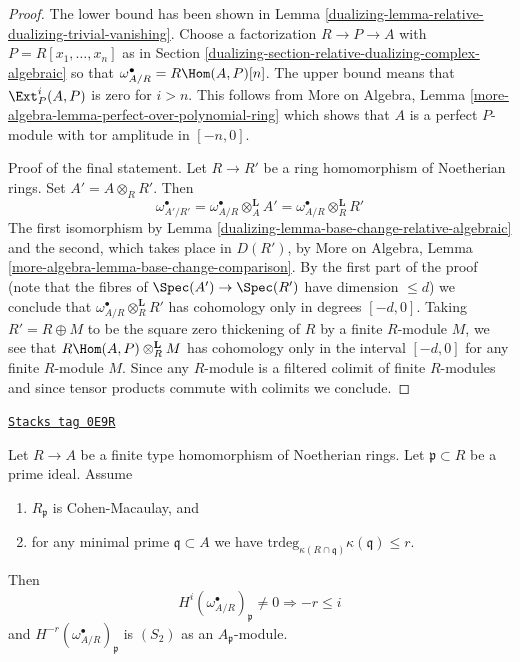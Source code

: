 \begin{proof}

The lower bound has been shown in
Lemma \ref{dualizing-lemma-relative-dualizing-trivial-vanishing}.
Choose a factorization $R \to P \to A$ with $P = R[x_1, \ldots, x_n]$
as in Section \ref{dualizing-section-relative-dualizing-complex-algebraic}
so that $\omega_{A/R}^\bullet = R\Hom(A, P)[n]$.
The upper bound means that $\Ext^i_P(A, P)$ is zero for $i > n$.
This follows from
More on Algebra, Lemma \ref{more-algebra-lemma-perfect-over-polynomial-ring}
which shows that $A$ is a perfect $P$-module with
tor amplitude in $[-n, 0]$.

\medskip\noindent
Proof of the final statement. Let $R \to R'$ be a ring homomorphism
of Noetherian rings. Set $A' = A \otimes_R R'$. Then
$$
\omega_{A'/R'}^\bullet =
\omega_{A/R}^\bullet \otimes_A^\mathbf{L} A' =
\omega_{A/R}^\bullet \otimes_R^\mathbf{L} R'
$$
The first isomorphism by Lemma \ref{dualizing-lemma-base-change-relative-algebraic}
and the second, which takes place in $D(R')$, by
More on Algebra, Lemma \ref{more-algebra-lemma-base-change-comparison}.
By the first part of the proof
(note that the fibres of $\Spec(A') \to \Spec(R')$ have dimension $\leq d$)
we conclude that $\omega_{A/R}^\bullet \otimes_R^\mathbf{L} R'$
has cohomology only in degrees $[-d, 0]$. Taking $R' = R \oplus M$
to be the square zero thickening of $R$ by a finite $R$-module $M$,
we see that $R\Hom(A, P) \otimes_R^\mathbf{L} M$
has cohomology only in the interval $[-d, 0]$ for any finite $R$-module $M$.
Since any $R$-module is a filtered colimit of finite $R$-modules
and since tensor products commute with colimits we conclude.
\end{proof}

\begin{lemma}
\label{dualizing-lemma-relative-dualizing-CM-vanishing}
\href{https://stacks.math.columbia.edu/tag/0E9R}{\texttt{Stacks tag 0E9R}}

Let $R \to A$ be a finite type homomorphism of Noetherian rings.
Let $\mathfrak p \subset R$ be a prime ideal. Assume
\begin{enumerate}
\item $R_\mathfrak p$ is Cohen-Macaulay, and
\item for any minimal prime $\mathfrak q \subset A$ we have
$\text{trdeg}_{\kappa(R \cap \mathfrak q)} \kappa(\mathfrak q) \leq r$.
\end{enumerate}
Then
$$
H^i(\omega_{A/R}^\bullet)_\mathfrak p \not = 0 \Rightarrow - r \leq i
$$
and $H^{-r}(\omega_{A/R}^\bullet)_\mathfrak p$ is $(S_2)$
as an $A_\mathfrak p$-module.
\end{lemma}

